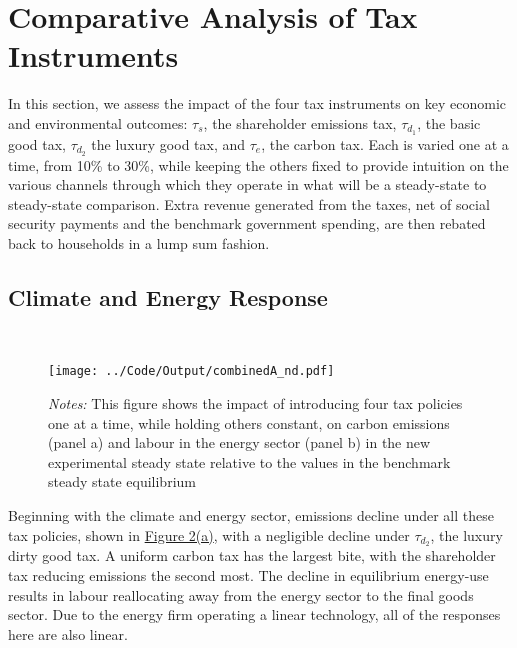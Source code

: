 \documentclass[12pt,a4paper]{article}
\begin{document}
 

\section{Comparative Analysis of Tax Instruments}

\hspace*{6mm}  In this section, we assess the impact of the four tax instruments on key economic and environmental outcomes: $\tau_s$, the shareholder emissions tax, $\tau_{d_1}$, the basic good tax, $\tau_{d_2}$ the luxury good tax, and $\tau_e$, the carbon tax. Each is varied one at a time, from 10\% to 30\%, while keeping the others fixed to provide intuition on the various channels through which they operate in what will be a steady-state to steady-state comparison. Extra revenue generated from the taxes, net of social security payments and the benchmark government spending, are then rebated back to households in a lump sum fashion.

\subsection{Climate and Energy Response}

\begin{figure}[h!]
    \centering
    \\  %
	\vspace{0.5em}

    \texttt{[image: ../Code/Output/combinedA\_nd.pdf]} 
    \captionsetup{font=footnotesize}
    	\vspace{-2em}
         \caption*{\textit{Notes:} This figure shows the impact of introducing four tax policies one at a time, while holding others constant, on carbon emissions (panel a) and labour in the energy sector (panel b) in the new experimental steady state relative to the values in the benchmark steady state equilibrium}
    \label{fig:energy}
   
\end{figure}


\hspace*{6mm} Beginning with the climate and energy sector, emissions decline under all these tax policies, shown in \hyperref[fig:energy]{Figure 2(a)}, with a negligible decline under $\tau_{d_2}$, the luxury dirty good tax. A uniform carbon tax has the largest bite, with the shareholder tax reducing emissions the second most. The decline in equilibrium energy-use results in labour reallocating away from the energy sector to the final goods sector. Due to the energy firm operating a linear technology, all of the responses here are also linear.
\end{document}
